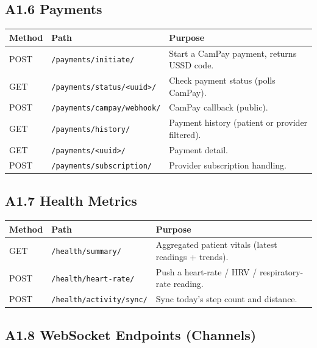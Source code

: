 \subsection*{A1.6 Payments}

\begin{longtable}{|p{1.4cm}|p{6.5cm}|p{6.0cm}|}
\hline
\textbf{Method} & \textbf{Path} & \textbf{Purpose} \\ \hline

\endhead
POST & \texttt{/payments/initiate/}            & Start a CamPay payment, returns USSD code. \\ \hline
GET  & \texttt{/payments/status/<uuid>/}       & Check payment status (polls CamPay). \\ \hline
POST & \texttt{/payments/campay/webhook/}      & CamPay callback (public). \\ \hline
GET  & \texttt{/payments/history/}             & Payment history (patient or provider filtered). \\ \hline
GET  & \texttt{/payments/<uuid>/}              & Payment detail. \\ \hline
POST & \texttt{/payments/subscription/}        & Provider subscription handling. \\ \hline

\end{longtable}

\subsection*{A1.7 Health Metrics}

\begin{longtable}{|p{1.4cm}|p{6.5cm}|p{6.0cm}|}
\hline
\textbf{Method} & \textbf{Path} & \textbf{Purpose} \\ \hline

\endhead
GET  & \texttt{/health/summary/}        & Aggregated patient vitals (latest readings + trends). \\ \hline
POST & \texttt{/health/heart-rate/}     & Push a heart-rate / HRV / respiratory-rate reading. \\ \hline
POST & \texttt{/health/activity/sync/}  & Sync today's step count and distance. \\ \hline

\end{longtable}

\subsection*{A1.8 WebSocket Endpoints (Channels)}

